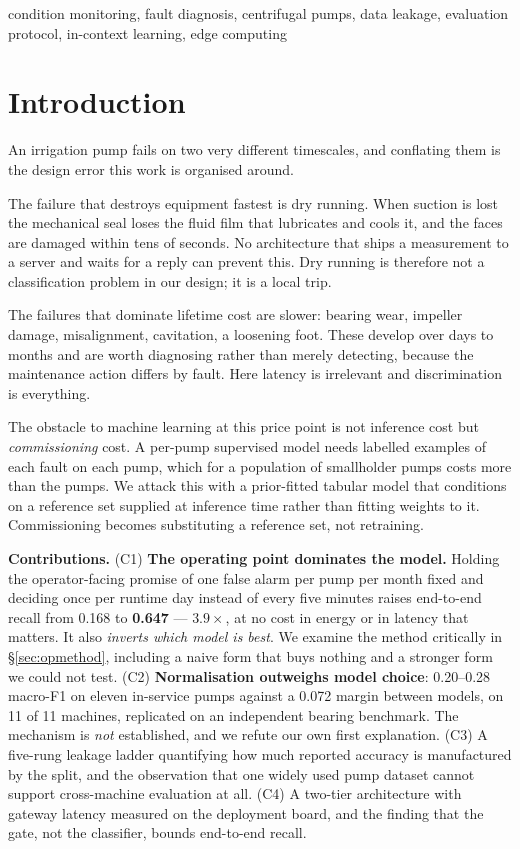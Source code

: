 \documentclass[conference,a4paper,10pt]{IEEEtran}
\begin{document}
\begin{IEEEkeywords}
condition monitoring, fault diagnosis, centrifugal pumps, data leakage,
evaluation protocol, in-context learning, edge computing
\end{IEEEkeywords}

\section{Introduction}
An irrigation pump fails on two very different timescales, and conflating them is
the design error this work is organised around.

The failure that destroys equipment fastest is dry running. When suction is lost
the mechanical seal loses the fluid film that lubricates and cools it, and the
faces are damaged within tens of seconds. No architecture that ships a
measurement to a server and waits for a reply can prevent this. Dry running is
therefore not a classification problem in our design; it is a local trip.

The failures that dominate lifetime cost are slower: bearing wear, impeller
damage, misalignment, cavitation, a loosening foot. These develop over days to
months and are worth diagnosing rather than merely detecting, because the
maintenance action differs by fault. Here latency is irrelevant and
discrimination is everything.

The obstacle to machine learning at this price point is not inference cost but
\emph{commissioning} cost. A per-pump supervised model needs labelled examples of
each fault on each pump, which for a population of smallholder pumps costs more
than the pumps. We attack this with a prior-fitted tabular model that conditions
on a reference set supplied at inference time rather than fitting weights to it.
Commissioning becomes substituting a reference set, not retraining.

\textbf{Contributions.}
(C1) \textbf{The operating point dominates the model.} Holding the operator-facing
promise of one false alarm per pump per month fixed and deciding once per runtime
day instead of every five minutes raises end-to-end recall from 0.168 to
\textbf{0.647} --- $3.9\times$, at no cost in energy or in latency that matters. It
also \emph{inverts which model is best}. We examine the method critically in
\S\ref{sec:opmethod}, including a naive form that buys nothing and a stronger form
we could not test.
(C2) \textbf{Normalisation outweighs model choice}: 0.20--0.28 macro-F1 on eleven
in-service pumps against a 0.072 margin between models, on 11 of 11 machines,
replicated on an independent bearing benchmark. The mechanism is \emph{not}
established, and we refute our own first explanation.
(C3) A five-rung leakage ladder quantifying how much reported accuracy is
manufactured by the split, and the observation that one widely used pump dataset
cannot support cross-machine evaluation at all.
(C4) A two-tier architecture with gateway latency measured on the deployment board,
and the finding that the gate, not the classifier, bounds end-to-end recall.
\end{document}
